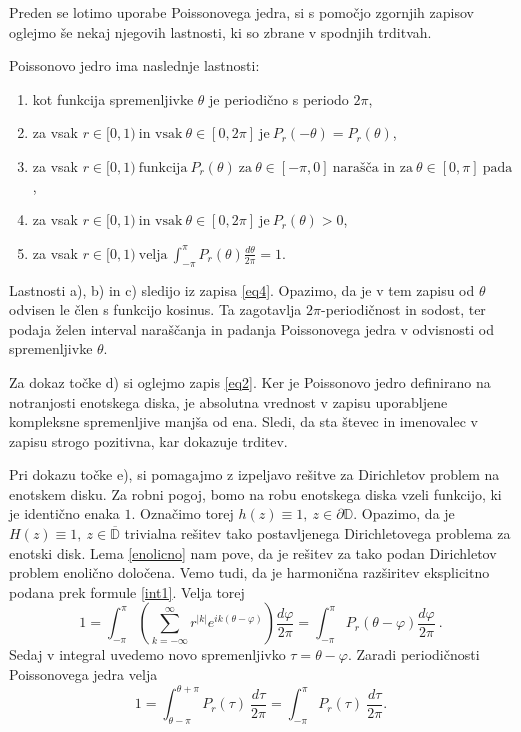 \documentclass[mat1, tisk]{fmfdelo}
\begin{document}
    Preden se lotimo uporabe Poissonovega jedra, si s pomočjo zgornjih zapisov oglejmo še nekaj njegovih lastnosti, ki so zbrane v spodnjih trditvah. 
    
    \begin{trditev}
        \label{lastpk}
        Poissonovo jedro ima naslednje lastnosti:
        \begin{enumerate}[label={\alph*)}]
            \item kot funkcija spremenljivke $\theta$ je periodično s periodo $2\pi$, 
            \item za vsak $r \in [0,1)~\text{in vsak}~\theta \in [0,2\pi]~\text{je}~P_r(-\theta) = P_r(\theta)$,
            \item za vsak $r \in [0,1)~\text{funkcija}~P_r(\theta)~\text{za}~\theta \in [-\pi, 0 ]~\text{narašča in za}~\theta \in [0, \pi ]~\text{pada}$,
            \item za vsak $r \in [0,1)~\text{in vsak}~\theta\in [0,2\pi]~\text{je}~P_r(\theta) > 0$,
            \item za vsak $r \in [0,1)~\text{velja}~\int_{-\pi}^{\pi}{P_r(\theta) \frac{d\theta}{2\pi}} = 1$.
        \end{enumerate}
    \end{trditev}
    \begin{dokaz}
        Lastnosti a), b) in c) sledijo iz zapisa \eqref{eq4}. Opazimo, da je v tem zapisu od $\theta$ odvisen le člen s funkcijo kosinus. 
        Ta zagotavlja $2\pi$-periodičnost in sodost, ter podaja želen interval naraščanja in padanja Poissonovega jedra v odvisnosti od spremenljivke $\theta$. 
        
        Za dokaz točke d) si oglejmo zapis \eqref{eq2}. Ker je Poissonovo jedro definirano na notranjosti enotskega diska, je absolutna vrednost v zapisu uporabljene kompleksne spremenljive manjša od ena. 
        Sledi, da sta števec in imenovalec v zapisu strogo pozitivna, kar dokazuje trditev. 

        Pri dokazu točke e), si pomagajmo z izpeljavo rešitve za Dirichletov problem na enotskem disku. 
        Za robni pogoj, bomo na robu enotskega diska vzeli funkcijo, ki je identično enaka $1$. Označimo torej $h(z) \equiv 1,~ z \in \partial \mathbb{D}$. Opazimo, da je \mbox{$H(z) \equiv 1,~z \in \overline{\mathbb{D}}$} trivialna rešitev tako postavljenega Dirichletovega problema za enotski disk.
        Lema \ref{enolicno} nam pove, da je rešitev za tako podan Dirichletov problem enolično določena. Vemo tudi, da je harmonična razširitev eksplicitno podana prek formule \eqref{int1}.
        Velja torej
        $$
        1 = \int_{-\pi}^{\pi}{\left(\sum_{k=-\infty}^{\infty}{r^{|k|} e^{ik(\theta - \varphi)}}\right) \frac{d \varphi}{2 \pi}} = \int_{-\pi}^{\pi}{P_r(\theta - \varphi)\frac{d \varphi}{2 \pi}}~. 
        $$
        Sedaj v integral uvedemo novo spremenljivko $\tau = \theta - \varphi$. Zaradi periodičnosti Poissonovega jedra velja 
        $$
        1 = \int_{\theta - \pi}^{\theta + \pi}{P_r(\tau)~\frac{d \tau}{2 \pi}} = \int_{-\pi}^{\pi}{P_r(\tau)~\frac{d \tau}{2 \pi}}.
        $$
    \end{dokaz}
\end{document}
